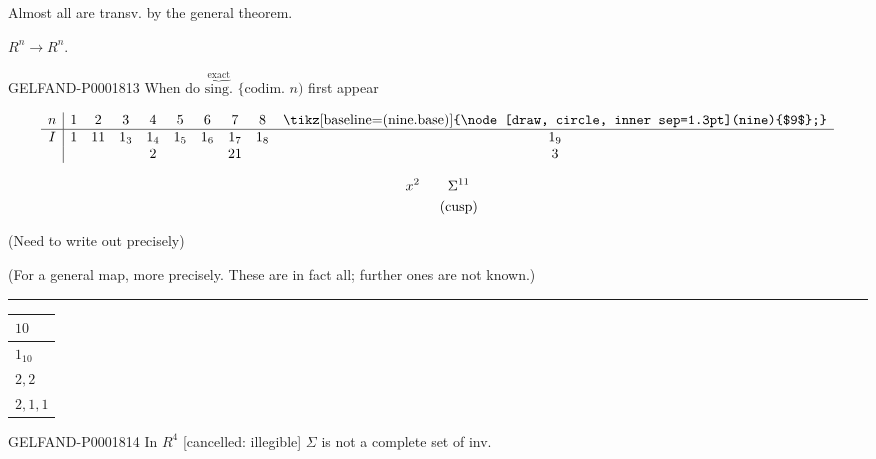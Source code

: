 Almost all are transv. by the general theorem.

\underline{$R^n\longrightarrow R^n$}.

\begin{GelfandAdjacentEvidence}{GELFAND-P000181}{3}
When do $\overset{\underbrace{\text{exact}}}{\text{sing.}}$ $\bigl\{\text{codim. }n\bigr)$ first appear
\end{GelfandAdjacentEvidence}

\begin{equation*}
\begin{array}{c|ccccccccc}
n&1&2&3&4&5&6&7&8&\text{\tikz[baseline=(nine.base)]{\node[draw, circle, inner sep=1.3pt](nine){$9$};}}\\\hline
I&1&11&1_3&1_4&1_5&1_6&1_7&1_8&1_9\\
 & & & &2& & &21& &3
\end{array}
\end{equation*}

\begin{gather*}x^2\qquad\Sigma^{11}\\\hphantom{x^2\qquad}(\text{cusp})\end{gather*}

(Need to write out precisely)

(For a general map, more precisely. These are in fact all; further ones are not known.)
\begin{flushright}\rule{.65\linewidth}{.4pt}\end{flushright}

\begin{center}
\begin{tabular}{p{34mm}}
$10$\\\hline
$1_{10}$\\
$2,2$\\
$2,1,1$
\end{tabular}
\end{center}

\begin{GelfandAdjacentEvidence}{GELFAND-P000181}{4}
In $R^4$ [cancelled: illegible] $\Sigma$ is not a complete set of inv.
\end{GelfandAdjacentEvidence}


